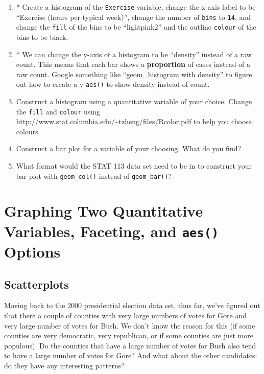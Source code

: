 \documentclass[
]{book}
\begin{document}
\begin{enumerate}
\def\labelenumi{\arabic{enumi}.}
\setcounter{enumi}{3}
\item
  * Create a histogram of the \texttt{Exercise} variable, change the x-axis label to be ``Exercise (hours per typical week)'', change the number of \texttt{bins} to \texttt{14}, and change the \texttt{fill} of the bins to be ``lightpink2'' and the outline \texttt{colour} of the bins to be black.
\item
  * We can change the y-axis of a histogram to be ``density'' instead of a raw count. This means that each bar shows a \textbf{proportion} of cases instead of a raw count. Google something like ``geom\_histogram with density'' to figure out how to create a y \texttt{aes()} to show density instead of count.
\item
  Construct a histogram using a quantitative variable of your choice. Change the \texttt{fill} and \texttt{colour} using http://www.stat.columbia.edu/\textasciitilde tzheng/files/Rcolor.pdf to help you choose colours.
\item
  Construct a bar plot for a variable of your choosing. What do you find?
\item
  What format would the STAT 113 data set need to be in to construct your bar plot with \texttt{geom\_col()} instead of \texttt{geom\_bar()}?
\end{enumerate}

\hypertarget{graphing-two-quantitative-variables-faceting-and-aes-options}{%
\section{\texorpdfstring{Graphing Two Quantitative Variables, Faceting, and \texttt{aes()} Options}{Graphing Two Quantitative Variables, Faceting, and aes() Options}}\label{graphing-two-quantitative-variables-faceting-and-aes-options}}

\hypertarget{scatterplots}{%
\subsection{Scatterplots}\label{scatterplots}}

Moving back to the 2000 presidential election data set, thus far, we've figured out that there a couple of counties with very large numbers of votes for Gore and very large number of votes for Bush. We don't know the reason for this (if some counties are very democratic, very republican, or if some counties are just more populous). Do the counties that have a large number of votes for Bush also tend to have a large number of votes for Gore? And what about the other candidates: do they have any interesting patterns?
\end{document}

